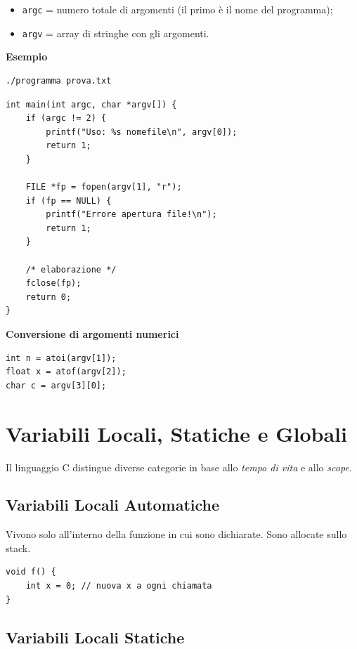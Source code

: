\documentclass[oneside]{scrbook}
\begin{document}
\begin{itemize}
    \item \texttt{argc} = numero totale di argomenti (il primo è il nome del programma);
    \item \texttt{argv} = array di stringhe con gli argomenti.
\end{itemize}

\textbf{Esempio}

\begin{lstlisting}[style=console]
    ./programma prova.txt
\end{lstlisting}

\begin{lstlisting}[style=cstyle]
int main(int argc, char *argv[]) {
    if (argc != 2) {
        printf("Uso: %s nomefile\n", argv[0]);
        return 1;
    }

    FILE *fp = fopen(argv[1], "r");
    if (fp == NULL) {
        printf("Errore apertura file!\n");
        return 1;
    }

    /* elaborazione */
    fclose(fp);
    return 0;
}
\end{lstlisting}

\textbf{Conversione di argomenti numerici}

\begin{lstlisting}[style=cstyle]
int n = atoi(argv[1]);
float x = atof(argv[2]);
char c = argv[3][0];
\end{lstlisting}

\section{Variabili Locali, Statiche e Globali}

Il linguaggio C distingue diverse categorie in base allo \emph{tempo di vita} e allo \emph{scope}.

\subsection{Variabili Locali Automatiche}

Vivono solo all'interno della funzione in cui sono dichiarate.
Sono allocate sullo stack.

\begin{lstlisting}[style=cstyle]
void f() {
    int x = 0; // nuova x a ogni chiamata
}
\end{lstlisting}

\subsection{Variabili Locali Statiche}
\end{document}
